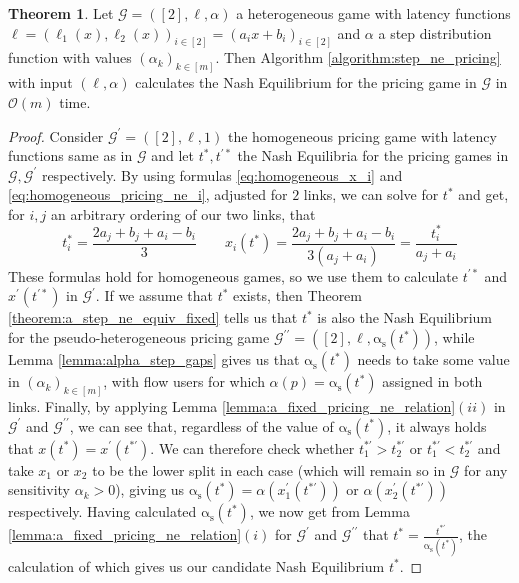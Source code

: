 \documentclass[10pt,a4paper]{book}
\newcommand{\as}{\mathrm{\alpha_s}}
\newcommand{\Gm}{\mathcal{G}}
\theoremstyle{definition}
\newtheorem{theorem}[definition]{Theorem}
\theoremstyle{comment}
\begin{document}
\begin{theorem}
	Let $\Gm = ([2], \ell, \alpha)$ a heterogeneous game with latency functions $\ell = (\ell_1(x), \ell_2(x))_{i \in [2]} = (a_ix + b_i)_{i \in [2]}$ and $\alpha$ a step distribution function with values $(\alpha_k)_{k \in [m]}$.
	Then Algorithm \ref{algorithm:step_ne_pricing} with input $(\ell, \alpha)$ calculates the Nash Equilibrium for the pricing game in $\Gm$ in $\mathcal{O}(m)$ time.
\end{theorem}

\begin{proof}
	Consider $\Gm^\prime = ([2], \ell, 1)$ the homogeneous pricing game with latency functions same as in $\Gm$ and let $t^*, t^{\prime*}$ the Nash Equilibria for the pricing games in $\Gm, \Gm^\prime$ respectively.
	By using formulas \ref{eq:homogeneous_x_i} and \ref{eq:homogeneous_pricing_ne_i}, adjusted for $2$ links, we can solve for $t^{*}$ and get, for $i, j$ an arbitrary ordering of our two links, that
	\[
		t_i^* = \frac{2 a_j + b_j + a_i - b_i}{3} \qquad x_i(t^*) = \frac{2 a_j + b_j + a_i - b_i}{3(a_j + a_i)} = \frac{t_i^*}{a_j + a_i}
	\]
	These formulas hold for homogeneous games, so we use them to calculate $t^{\prime*}$ and $x^\prime(t^{\prime*})$ in $\Gm^\prime$.
	If we assume that $t^*$ exists, then Theorem \ref{theorem:a_step_ne_equiv_fixed} tells us that $t^*$ is also the Nash Equilibrium for the pseudo-heterogeneous pricing game $\Gm^{\prime\prime} = ([2], \ell, \as(t^*))$, while Lemma \ref{lemma:alpha_step_gaps} gives us that $\as(t^*)$ needs to take some value in $(\alpha_k)_{k \in [m]}$, with flow users for which $\alpha(p) = \as(t^*)$ assigned in both links.
	Finally, by applying Lemma \ref{lemma:a_fixed_pricing_ne_relation}$(ii)$ in $\Gm^\prime$ and $\Gm^{\prime\prime}$, we can see that, regardless of the value of $\as(t^*)$, it always holds that $x(t^*) = x^\prime(t^{*\prime})$.
	We can therefore check whether $t_1^{*\prime} > t_2^{*\prime}$ or $t_1^{*\prime} < t_2^{*\prime}$ and take $x_1$ or $x_2$ to be the lower split in each case (which will remain so in $\Gm$ for any sensitivity $\alpha_k > 0$), giving us $\as(t^*) = \alpha(x_1^\prime(t^{*\prime}))$ or $\alpha(x_2^\prime(t^{*\prime}))$ respectively.
	Having calculated $\as(t^*)$, we now get from Lemma \ref{lemma:a_fixed_pricing_ne_relation}$(i)$ for $\Gm^\prime$ and $\Gm^{\prime\prime}$ that $t^* = \tfrac{t^{*\prime}}{\as(t^*)}$, the calculation of which gives us our candidate Nash Equilibrium $t^*$.


\end{proof}
\end{document}
